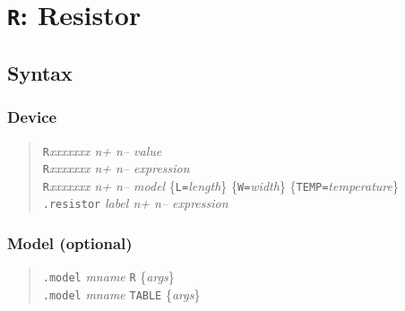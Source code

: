 %
%
%
%
\section{{\tt R}: Resistor}
\subsection{Syntax}
\subsubsection{Device}
\begin{verse}
{\tt R}{\it xxxxxxx n+ n-- value}\\
{\tt R}{\it xxxxxxx n+ n-- expression}\\
{\tt R}{\it xxxxxxx n+ n-- model} \{{\tt L=}{\it length}\}
        \{{\tt W=}{\it width}\} \{{\tt TEMP=}{\it temperature}\} \\
{\tt .resistor} {\it label n+ n-- expression}
\end{verse}
\subsubsection{Model (optional)}
\begin{verse}
{\tt .model} {\it mname} {\tt R} \{{\it args}\} \\
{\tt .model} {\it mname} {\tt TABLE} \{{\it args}\}
\end{verse}
